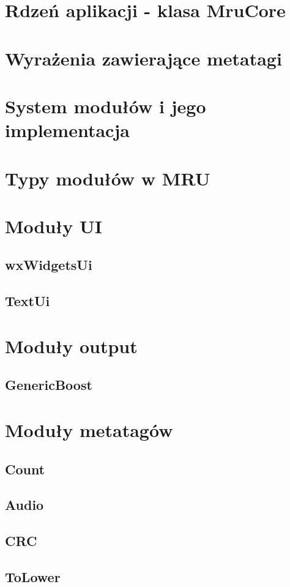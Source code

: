 \section{Rdzeń aplikacji - klasa MruCore}

\section{Wyrażenia zawierające metatagi}

\section{System modułów i jego implementacja}

\section{Typy modułów w MRU}

\section{Moduły UI}
\subsection{wxWidgetsUi}
\subsection{TextUi}

\section{Moduły output}
\subsection{GenericBoost}

\section{Moduły metatagów}
\subsection{Count}
\subsection{Audio}
\subsection{CRC}
\subsection{ToLower}

\label{}
